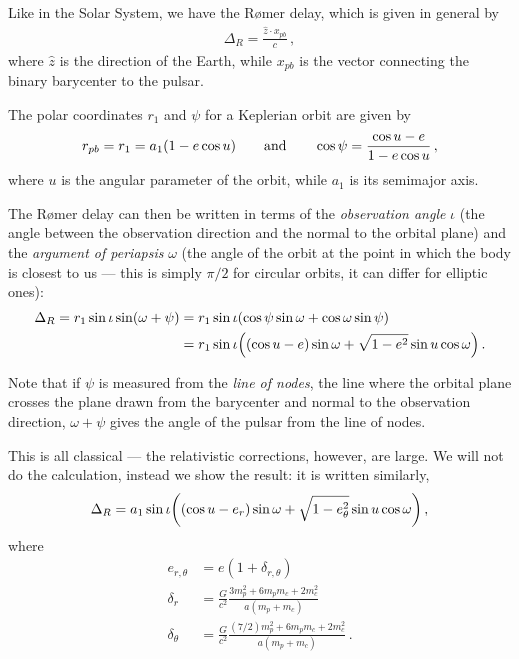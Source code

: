 \documentclass[main.tex]{subfiles}
\begin{document}
Like in the Solar System, we have the Rømer delay, which is given in general by 
%
\begin{align}
\Delta_{R} = \frac{\hat{z} \cdot x_{pb}}{c}
\,,
\end{align}
%
where \(\hat{z}\) is the direction of the Earth, while \(x_{pb}\) is the vector connecting the binary barycenter to the pulsar. 

The polar coordinates \(r_1 \) and \(\psi \) for a Keplerian orbit are given by
%
\begin{align}
r_{pb} = r_1 = a_1 \qty(1 - e \cos u )
\qquad \text{and} \qquad
\cos \psi = \frac{\cos u - e}{1- e \cos u}
\,,
\end{align}
%
where \(u\) is the angular parameter of the orbit, while \(a_1 \) is its semimajor axis.

The Rømer delay can then be written in terms of the \emph{observation angle} \(\iota \) (the angle between the observation direction and the normal to the orbital plane) and the \emph{argument of periapsis} \(\omega\) (the angle of the orbit at the point in which the body is closest to us --- this is simply \(\pi /2\) for circular orbits, it can differ for elliptic ones):
%
\begin{align}
\Delta_{R} = r_1 \sin \iota \sin(\omega+\psi ) 
&= r_1 \sin \iota \qty(\cos \psi \sin \omega + \cos \omega \sin \psi )  \\
& =r_1 \sin \iota \qty( (\cos u - e) \sin \omega + \sqrt{1 - e^2} \sin u \cos \omega )
\,.
\end{align}
%

Note that if \(\psi \) is measured from the \emph{line of nodes}, the line where the orbital plane crosses the plane drawn from the barycenter and normal to the observation direction, \(\omega + \psi \) gives the angle of the pulsar from the line of nodes.

This is all classical --- the relativistic corrections, however, are large. 
We will not do the calculation, instead we show the result: it is written similarly,
%
\begin{align}
\Delta_{R} = a_1 \sin \iota 
\qty((\cos u - e_r ) \sin \omega + \sqrt{1 - e^2_{\theta }} \sin u \cos \omega )
\,, 
\end{align}
%
where 
%
\begin{subequations}
\begin{align}
e_{r, \theta } &= e (1 + \delta_{r, \theta })  \\
\delta_{r} &= \frac{G}{c^2} \frac{3 m_p^2 + 6 m_p m_c + 2 m_c^2}{a (m_p + m_c)}  \\
\delta_{\theta } &= \frac{G}{c^2} 
\frac{(7/2) m_p^2 + 6 m_p m_c + 2 m_c^2}{a (m_p + m_c)}
\,.
\end{align}
\end{subequations}
\end{document}
